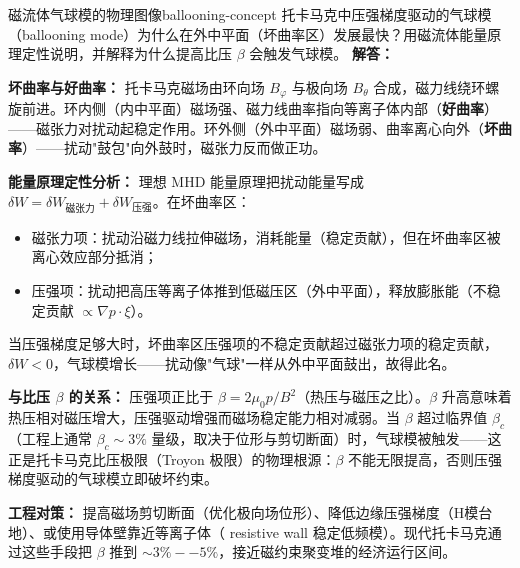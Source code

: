 \begin{example}{磁流体气球模的物理图像}{ballooning-concept}
托卡马克中压强梯度驱动的气球模（ballooning mode）为什么在外中平面（坏曲率区）发展最快？用磁流体能量原理定性说明，并解释为什么提高比压 $\beta$ 会触发气球模。
\tcblower
\textbf{解答：}

\textbf{坏曲率与好曲率：} 托卡马克磁场由环向场 $B_\varphi$ 与极向场 $B_\theta$ 合成，磁力线绕环螺旋前进。环内侧（内中平面）磁场强、磁力线曲率指向等离子体内部（\textbf{好曲率}）——磁张力对扰动起稳定作用。环外侧（外中平面）磁场弱、曲率离心向外（\textbf{坏曲率}）——扰动"鼓包"向外鼓时，磁张力反而做正功。

\textbf{能量原理定性分析：} 理想 MHD 能量原理把扰动能量写成 $\delta W = \delta W_{\text{磁张力}} + \delta W_{\text{压强}}$。在坏曲率区：
\begin{itemize}[leftmargin=*,itemsep=0pt]
\item 磁张力项：扰动沿磁力线拉伸磁场，消耗能量（稳定贡献），但在坏曲率区被离心效应部分抵消；
\item 压强项：扰动把高压等离子体推到低磁压区（外中平面），释放膨胀能（不稳定贡献 $\propto \nabla p\cdot\xi$）。
\end{itemize}
当压强梯度足够大时，坏曲率区压强项的不稳定贡献超过磁张力项的稳定贡献，$\delta W<0$，气球模增长——扰动像"气球"一样从外中平面鼓出，故得此名。

\textbf{与比压 $\beta$ 的关系：} 压强项正比于 $\beta = 2\mu_0 p/B^2$（热压与磁压之比）。$\beta$ 升高意味着热压相对磁压增大，压强驱动增强而磁场稳定能力相对减弱。当 $\beta$ 超过临界值 $\beta_c$（工程上通常 $\beta_c\sim3\%$ 量级，取决于位形与剪切断面）时，气球模被触发——这正是托卡马克比压极限（Troyon 极限）的物理根源：$\beta$ 不能无限提高，否则压强梯度驱动的气球模立即破坏约束。

\textbf{工程对策：} 提高磁场剪切断面（优化极向场位形）、降低边缘压强梯度（H模台地）、或使用导体壁靠近等离子体（ resistive wall 稳定低频模）。现代托卡马克通过这些手段把 $\beta$ 推到 $\sim3\%--5\%$，接近磁约束聚变堆的经济运行区间。
\end{example}

